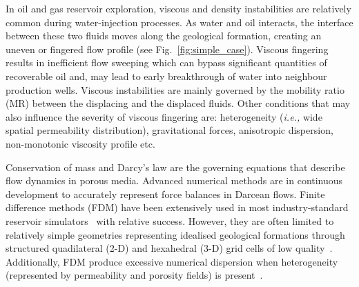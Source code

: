 \documentclass[preprint,authoryear,12pt]{elsarticle}
\newcommand{\ie}{{\it i.e., }}
\begin{document}
\medskip
In oil and gas reservoir exploration, viscous and density instabilities are relatively common during water-injection processes. As water and oil interacts, the interface between these two fluids moves along the geological formation, creating an uneven or fingered flow profile (see Fig.~\ref{fig:simple_case}). Viscous fingering results in inefficient flow sweeping which can bypass significant quantities of recoverable oil and, may lead to early breakthrough of water into neighbour production wells. Viscous instabilities are mainly governed by the mobility ratio (MR) between the displacing and the displaced fluids. Other conditions that may also influence the severity of viscous fingering are: heterogeneity (\ie wide spatial permeability distribution), gravitational forces, anisotropic dispersion, non-monotonic viscosity profile etc.

\medskip 
Conservation of mass and Darcy's law are the governing equations that describe flow dynamics in porous media. Advanced numerical methods are in continuous development to accurately represent force balances in Darcean flows. Finite difference methods (FDM) have been extensively used in most industry-standard reservoir simulators~\citep{aziz_1986, chen_2005, chang_1990} with relative success. However, they are often limited to relatively simple geometries representing idealised geological formations through structured quadilateral (2-D) and hexahedral (3-D) grid cells of low quality~\citep{mlacnik_2004, king_1999}. Additionally, FDM produce excessive numerical dispersion when heterogeneity (represented by permeability and porosity fields) is present~\citep{chavent_1986}.
\end{document}
